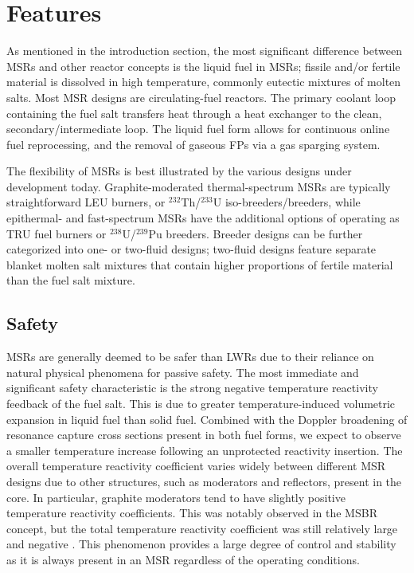 \section{Features}

As mentioned in the introduction section, the most significant difference
between \glspl{MSR} and other reactor concepts is the liquid fuel in
\glspl{MSR}; fissile and/or fertile material is dissolved in high temperature,
commonly eutectic mixtures of molten salts. Most \gls{MSR} designs are
circulating-fuel reactors. The primary coolant loop containing the fuel salt
transfers heat through a heat exchanger to the clean, secondary/intermediate
loop. The liquid fuel form allows for continuous online fuel reprocessing,
and the removal of gaseous \glspl{FP} via a gas sparging system.

The flexibility of \glspl{MSR} is best illustrated by the various designs
under development today. Graphite-moderated thermal-spectrum \glspl{MSR} are
typically straightforward \gls{LEU} burners, or $^{232}$Th/$^{233}$U
iso-breeders/breeders, while epithermal- and fast-spectrum \glspl{MSR} have
the additional options of operating as \gls{TRU} fuel burners or
$^{238}$U/$^{239}$Pu breeders. Breeder designs can be further categorized into
one- or two-fluid designs; two-fluid designs feature separate blanket molten
salt mixtures that contain higher proportions of fertile material than the
fuel salt mixture.

\subsection{Safety}

\glspl{MSR} are generally deemed to be safer than \glspl{LWR} due to their
reliance on natural physical phenomena for passive safety.
The most immediate and significant safety characteristic is the strong
negative temperature reactivity feedback of the fuel salt. This is due to
greater temperature-induced volumetric expansion in liquid fuel than solid
fuel. Combined with the Doppler broadening of resonance capture cross sections
present in both fuel forms, we expect to observe a smaller temperature
increase following an unprotected reactivity insertion. The overall
temperature reactivity coefficient varies widely between different \gls{MSR}
designs due to other structures, such as moderators and reflectors, present in
the core. In particular, graphite moderators tend to have slightly positive
temperature reactivity coefficients. This was notably observed in the
\gls{MSBR} concept, but the total temperature reactivity coefficient was still
relatively large and negative \cite{rykhlevskii_modeling_2019}. This
phenomenon provides a large degree of control and stability as it is always
present in an \gls{MSR} regardless of the operating conditions.

